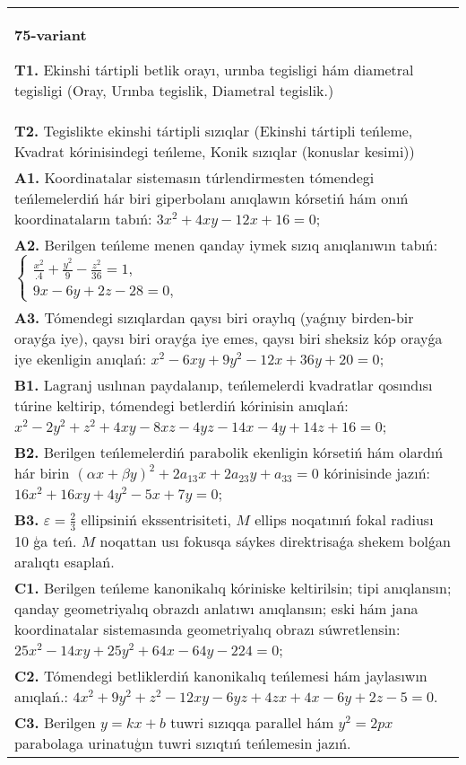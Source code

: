 \documentclass{article}
\begin{document}
\begin{tabular}{m{17cm}}
\textbf{75-variant}
\newline

\textbf{T1.} Ekinshi tártipli betlik orayı, urınba tegisligi hám diametral tegisligi (Oray, Urınba tegislik, Diametral tegislik.) \\
\textbf{T2.} Tegislikte ekinshi tártipli sızıqlar (Ekinshi tártipli teńleme, Kvadrat kórinisindegi teńleme, Konik sızıqlar (konuslar kesimi)) \\
\textbf{A1.} Koordinatalar sistemasın túrlendirmesten tómendegi teńlemelerdiń hár biri giperbolanı anıqlawın kórsetiń hám onıń koordinataların tabıń: $3 x^2+4 x y-12 x+16=0$; \\
\textbf{A2.} Berilgen teńleme menen qanday iymek sızıq anıqlanıwın tabıń: $\left\{\begin{array}{l}\frac{x^2}{.4}+\frac{y^2}{9}-\frac{z^2}{36}=1, \\ 9 x-6 y+2 z-28=0,\end{array}\right.$ \\
\textbf{A3.} Tómendegi sızıqlardan qaysı biri oraylıq (yaǵnıy birden-bir orayǵa iye), qaysı biri orayǵa iye emes, qaysı biri sheksiz kóp orayǵa iye ekenligin anıqlań: $x^2-6 x y+9 y^2-12 x+36 y+20=0$; \\
\textbf{B1.} Lagranj usılınan paydalanıp, teńlemelerdi kvadratlar qosındısı túrine keltirip, tómendegi betlerdiń kórinisin anıqlań: $x^2-2 y^2+z^2+4 x y-8 x z-4 y z-14 x-4 y+14 z+16=0$; \\
\textbf{B2.} Berilgen teńlemelerdiń parabolik ekenligin kórsetiń hám olardıń hár birin $(\alpha x+\beta y)^2+2 a_{13} x+2 a_{23} y+a_{33}=0$ kórinisinde jazıń:  $16 x^2+16 x y+4 y^2-5 x+7 y=0$; \\
\textbf{B3.} $\varepsilon=\frac{2}{3}$ ellipsiniń ekssentrisiteti, $M$ ellips noqatınıń fokal radiusı 10 ģa teń. $M$ noqattan usı fokusqa sáykes direktrisaǵa shekem bolǵan aralıqtı esaplań. \\
\textbf{C1.} Berilgen teńleme kanonikalıq kóriniske keltirilsin; tipi anıqlansın; qanday geometriyalıq obrazdı anlatıwı anıqlansın; eski hám jana koordinatalar sistemasında geometriyalıq obrazı súwretlensin: $25 x^2-14 x y+25 y^2+64 x-64 y-224=0$; \\
\textbf{C2.} Tómendegi betliklerdiń kanonikalıq teńlemesi hám jaylasıwın anıqlań.: $4 x^2+9 y^2+z^2-12 x y-6 y z+4 z x+4 x-6 y+2 z-5=0$. \\
\textbf{C3.} Berilgen $y=k x+b$ tuwri sızıqqa parallel hám $y^2=2 p x$ parabolaga urinatuģın tuwri sızıqtıń teńlemesin jazıń. \\

\end{tabular}
\vspace{1cm}
\end{document}
